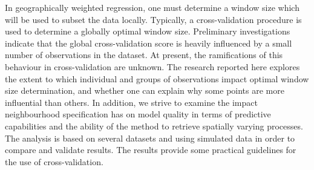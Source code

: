 In geographically weighted regression, one must determine a window size which will be used to subset the data locally. Typically, a cross-validation procedure is used to determine a globally optimal window size. Preliminary investigations indicate that the global cross-validation score is heavily influenced by a small number of observations in the dataset. At present, the ramifications of this behaviour in cross-validation are unknown. The research reported here explores the extent to which individual and groups of observations impact optimal window size determination, and whether one can explain why some points are more influential than others. In addition, we strive to examine the impact neighbourhood specification has on model quality in terms of predictive capabilities and the ability of the method to retrieve spatially varying processes. The analysis is based on several datasets and using simulated data in order to compare and validate results. The results provide some practical guidelines for the use of cross-validation.